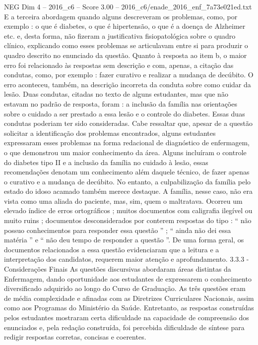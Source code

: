 \begin{textsample}{NEG Dim 4 – 2016\_c6 – Score 3.00 – 2016\_c6/enade\_2016\_enf\_7a73e021ed.txt}
E a terceira abordagem quando alguns descreveram os problemas, como, por exemplo : o que é diabetes, o que é hipertensão, o que é a doença de Alzheimer etc. e, desta forma, não fizeram a justificativa fisiopatológica sobre o quadro clínico, explicando como esses problemas se articulavam entre si para produzir o quadro descrito no enunciado da questão.
Quanto à resposta ao item b, o maior erro foi relacionado às respostas sem descrição e com, apenas, a citação das condutas, como, por exemplo : fazer curativo e realizar a mudança de decúbito.
O erro aconteceu, também, na descrição incorreta da conduta sobre como cuidar da lesão.
Duas condutas, citadas no texto de alguns estudantes, mas que não estavam no padrão de resposta, foram : a inclusão da família nas orientações sobre o cuidado a ser prestado a essa lesão e o controle do diabetes.
Essas duas condutas poderiam ter sido consideradas.
Cabe ressaltar que, apesar de a questão solicitar a identificação dos problemas encontrados, alguns estudantes expressaram esses problemas na forma redacional de diagnóstico de enfermagem, o que demonstrou um maior conhecimento da área.
Alguns incluíram o controle do diabetes tipo II e a inclusão da família no cuidado à lesão, essas recomendações denotam um conhecimento além daquele técnico, de fazer apenas o curativo e a mudança de decúbito.
No entanto, a culpabilização da família pelo estado do idoso acamado também merece destaque.
A família, nesse caso, não era vista como uma aliada do paciente, mas, sim, quem o maltratava.
Ocorreu um elevado índice de erros ortográficos ; muitos documentos com caligrafia ilegível ou muito ruins ; documentos desconsiderados por conterem respostas do tipo : “ não possuo conhecimentos para responder essa questão ” ; “ ainda não dei essa matéria ” e “ não deu tempo de responder a questão ”.
De uma forma geral, os documentos relacionados a essa questão evidenciaram que a leitura e a interpretação dos candidatos, requerem maior atenção e aprofundamento. 3.3.3 - Considerações Finais As questões discursivas abordaram áreas distintas da Enfermagem, dando oportunidade aos estudantes de expressarem o conhecimento diversificado adquirido ao longo do Curso de Graduação.
As três questões eram de média complexidade e afinadas com as Diretrizes Curriculares Nacionais, assim como aos Programas do Ministério da Saúde.
Entretanto, as respostas construídas pelos estudantes mostraram certa dificuldade na capacidade de compreensão dos enunciados e, pela redação construída, foi percebida dificuldade de síntese para redigir respostas corretas, concisas e coerentes.

\end{textsample}
